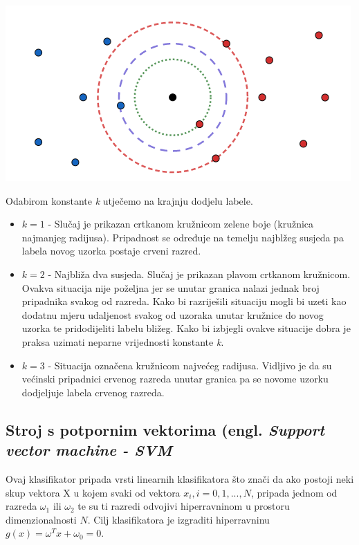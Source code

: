 \documentclass[times, utf8, zavrsni, numeric]{fer}
\begin{document}
\begin{minipage}{\linewidth}
\vspace{10pt}
\centering
\includegraphics[width=0.8\linewidth]{img/klas.png}
\end{minipage}

\bigbreak

Odabirom konstante \textit{k} utječemo na krajnju dodjelu labele.

\begin{itemize}
	\item \(k=1\) - Slučaj je prikazan crtkanom kružnicom zelene boje (kružnica najmanjeg 
	radijusa). Pripadnost se određuje na temelju najblžeg susjeda pa labela
	novog uzorka postaje crveni razred.
	\item \(k=2\) - Najbliža dva susjeda. Slučaj je prikazan plavom crtkanom kružnicom.
	Ovakva situacija nije poželjna jer se unutar granica nalazi jednak 
	broj pripadnika svakog od razreda. Kako bi razriješili situaciju mogli bi uzeti
	kao dodatnu mjeru udaljenost svakog od uzoraka unutar kružnice do novog uzorka te
	pridodijeliti labelu bližeg. Kako bi izbjegli ovakve situacije dobra je praksa 
	uzimati neparne vrijednosti konstante \textit{k}.
	\item \(k=3\) - Situacija označena kružnicom najvećeg radijusa. Vidljivo
	je da su većinski pripadnici crvenog razreda unutar granica pa se
	novome uzorku dodjeljuje labela crvenog razreda.
\end{itemize}

\newpage

\subsection{Stroj s potpornim vektorima (engl. \textit{Support vector machine - SVM}}

Ovaj klasifikator pripada vrsti linearnih klasifikatora što znači da 
ako postoji neki skup vektora X u kojem svaki od vektora \(x_i, i = 0, 1, ..., N\), 
pripada jednom od razreda \(\omega_1\) ili \(\omega_2\) te su ti razredi odvojivi hiperravninom 
u prostoru dimenzionalnosti \(N\). Cilj klasifikatora je izgraditi hiperravninu 
\(g(x) = \omega^Tx+\omega_0=0\).
\end{document}
